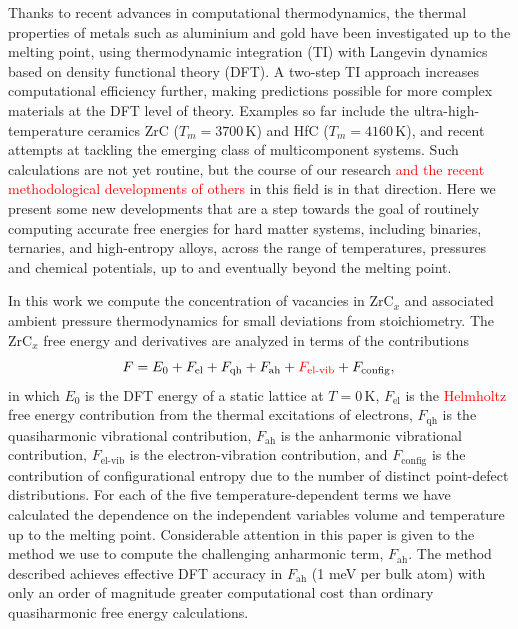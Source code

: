 \documentclass[twocolumn,american,aps,prb,showpacs,showkeys,amsmath,amssymb,superscriptaddress,a4]{revtex4-1}
\begin{document}
Thanks to recent advances in computational thermodynamics, the thermal
properties of metals such as aluminium and gold have been investigated
up to the melting point, using thermodynamic integration (TI) with Langevin dynamics\cite{Grabowski2009,Grabowski2015,Glensk2014} based on density functional theory (DFT).
A two-step TI approach increases computational efficiency further,
making predictions possible for more complex materials at the DFT level
of theory. Examples so far include the ultra-high-temperature ceramics
ZrC ($T_{m}=3700\,\text{K}$) and HfC ($T_{m}=4160\,\text{K}$),\cite{Duff2015,Duff2018} and recent attempts at tackling the emerging class of multicomponent systems.\cite{Ikeda2018,Grabowski} 
Such calculations are not yet routine, but the course of our research  \textcolor{red}{and the recent methodological developments of others\citep{Wu2009,Moustafa2017a,Purohit2018}} in this field is 
in that direction. Here we present some new developments that are a step towards the goal of routinely               
computing accurate free energies for hard matter systems, including
binaries, ternaries, and high-entropy alloys, across  the 
range of temperatures, pressures and chemical potentials, up to and eventually beyond the melting point.

In this work we compute the concentration of vacancies in ZrC$_x$
and associated ambient pressure thermodynamics for small deviations from stoichiometry. The
ZrC$_x$ free energy and derivatives are analyzed in
terms of the contributions\citep{Zhang2018}
\begin{equation}
F=E_{0}+F_{\text{el}}+F_{\text{qh}}+F_{\text{ah}}+ \textcolor{red}{F_{\text{el-vib}}}+F_{\text{config}},\,\label{eq: free_energy_contributions}
\end{equation}
in which $E_{0}$ is the  DFT energy of a static lattice at $T=0\,$K, $F_{\text{el}}$ is the  \textcolor{red}{Helmholtz} free energy contribution from the thermal excitations of electrons, $F_{\text{qh}}$ is the quasiharmonic vibrational contribution, $F_{\text{ah}}$ is the anharmonic vibrational contribution, $F_{\text{el-vib}}$ is the electron-vibration contribution, and $F_{\text{config}}$ is the contribution of configurational entropy due to the number of distinct point-defect distributions.
For each of the five temperature-dependent terms we have calculated the dependence on the independent variables volume and temperature up to the melting point. Considerable attention in this paper is given to the method we use
to compute the challenging anharmonic term, $F_{\text{ah}}$. The
method described achieves effective DFT accuracy in $F_{\text{ah}}$ (1 meV
per bulk atom) with only an order of magnitude greater computational
cost than ordinary quasiharmonic free energy calculations. 
\end{document}
